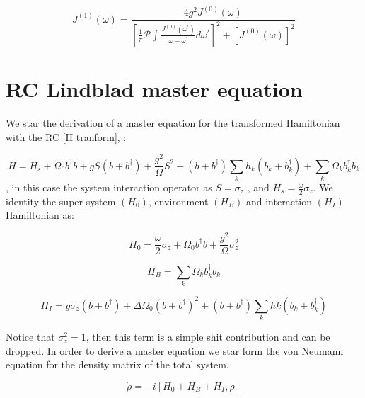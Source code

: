 \documentclass[%
preprint,
onecolumn,
notitlepag,
 amsmath,amssymb,
 aps,
 pra,
]{revtex4-2}
\begin{document}
\begin{itemize}
\begin{equation}
J^{(1)}(\omega)=\frac{4 g^{2} J^{(0)}(\omega)}{\left[\frac{1}{\pi} \mathcal{P} \int \frac{J^{(0)}\left(\omega^{\prime}\right)}{\omega-\omega^{\prime}} d \omega^{\prime}\right]^{2}+\left[J^{(0)}(\omega)\right]^{2}}
\end{equation}



\section{RC Lindblad master equation}
\label{B:LME}


We star the derivation of a master equation for the transformed Hamiltonian with the RC \ref{H tranform},  :

\begin{equation}
    H=H_s +\Omega_0 b ^{\dagger} b  + g S \left( b + b ^{\dagger} \right) + \frac{g^2}{\Omega} S^2  + \left( b + b ^{\dagger} \right) \sum_k h_k \left( b_k + b_k ^{\dagger} \right) + \sum_{k} \Omega_k b_k ^{\dagger} b_k
\end{equation}
, in this case the system interaction operator as $S=\sigma_z$ , and $H_s= \frac{\omega}{2} \sigma_z $. We identity the super-system $(H_0)$, environment $(H_B)$ and interaction $(H_I)$ Hamiltonian as:

\begin{equation}
    H_0= \frac{\omega}{2} \sigma_z + \Omega_0 b ^{\dagger} b + \frac{g^2}{\Omega} \sigma_z^2 
\end{equation}

\begin{equation}
    H_B= \sum_{k} \Omega_k b_k ^{\dagger} b_k
\end{equation}    

\begin{equation}
    H_I= g \sigma_z  \left( b + b ^{\dagger} \right) +  \Delta \Omega_0 \left( b + b ^{\dagger} \right)^2 +   \left( b + b ^{\dagger} \right) \sum_k hk \left( b_k + b_k ^{\dagger} \right)
\end{equation}

Notice that $\sigma_z^2= 1$, then this term is a simple shit contribution and can be dropped. In order to derive a master equation we star form the von Neumann equation for the density matrix of the total system.

\begin{equation}
    \dot{\rho} = -i \left[ H_0 + H_B + H_I , \rho \right]
\end{equation}


\end{itemize}
\end{document}
